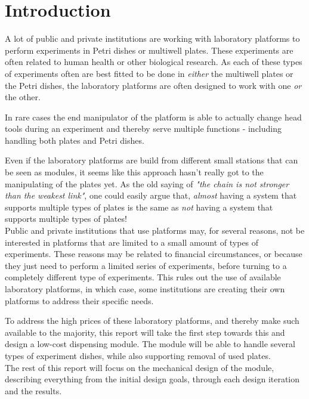 \documentclass[10pt,a4paper]{article}
\begin{document}
	\section{Introduction}
	
	A lot of public and private institutions are working with laboratory platforms to perform experiments in Petri dishes or multiwell plates. These experiments are often related to human health or other biological research. As each of these types of experiments often are best fitted to be done in \textit{either} the multiwell plates or the Petri dishes, the laboratory platforms are often designed to work with one \textit{or} the other.
	
	In rare cases\cite{tecan_webpage} the end manipulator of the platform is able to actually change head tools during an experiment and thereby serve multiple functions - including handling both  plates and Petri dishes.
	
	Even if the laboratory platforms are build from different small stations that can be seen as modules, it seems like this approach hasn't really got to the manipulating of the plates yet. 
	As the old saying of \textit{"the chain is not stronger than the weakest link"}, one could easily argue that, \textit{almost} having a system that supports multiple types of plates is the same as \textit{not} having a system that supports multiple types of plates!\\
	
	Public and private institutions that use platforms may, for several reasons, not be interested in platforms that are limited to a small amount of types of experiments. These reasons may be related to financial circumstances, or because they just need to perform a limited series of experiments, before turning to a completely different type of experiments. This rules out the use of available laboratory platforms, in which case, some institutions are creating their own platforms to address their specific needs.
	
	To address the high prices of these laboratory platforms, and thereby make such available to the majority, this report will take the first step towards this and design a low-cost dispensing module. The module will be able to handle several types of experiment dishes, while also supporting removal of used plates.\\
	
	The rest of this report will focus on the mechanical design of the module, describing everything from the initial design goals, through each design iteration and the results.
	
\end{document}
